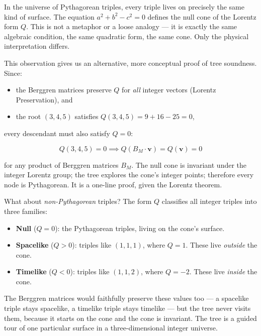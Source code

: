 In the universe of Pythagorean triples, every triple lives on precisely the same kind of surface. The equation \(a^2 + b^2 - c^2 = 0\) defines the null cone of the Lorentz form \(Q\). This is not a metaphor or a loose analogy --- it is exactly the same algebraic condition, the same quadratic form, the same cone. Only the physical interpretation differs.

This observation gives us an alternative, more conceptual proof of tree soundness. Since:

\begin{itemize}

\item
  the Berggren matrices preserve \(Q\) for \emph{all} integer vectors (Lorentz Preservation), and
\item
  the root \((3, 4, 5)\) satisfies \(Q(3, 4, 5) = 9 + 16 - 25 = 0\),
\end{itemize}

every descendant must also satisfy \(Q = 0\):

\[Q(3, 4, 5) = 0 \implies Q(B_M \cdot \mathbf{v}) = Q(\mathbf{v}) = 0\]

for any product of Berggren matrices \(B_M\). The null cone is invariant under the integer Lorentz group; the tree explores the cone's integer points; therefore every node is Pythagorean. It is a one-line proof, given the Lorentz theorem.

What about \emph{non-Pythagorean} triples? The form \(Q\) classifies all integer triples into three families:

\begin{itemize}

\item
  \textbf{Null} (\(Q = 0\)): the Pythagorean triples, living on the cone's surface.
\item
  \textbf{Spacelike} (\(Q > 0\)): triples like \((1, 1, 1)\), where \(Q = 1\). These live \emph{outside} the cone.
\item
  \textbf{Timelike} (\(Q < 0\)): triples like \((1, 1, 2)\), where \(Q = -2\). These live \emph{inside} the cone.
\end{itemize}

The Berggren matrices would faithfully preserve these values too --- a spacelike triple stays spacelike, a timelike triple stays timelike --- but the tree never visits them, because it starts on the cone and the cone is invariant. The tree is a guided tour of one particular surface in a three-dimensional integer universe.


